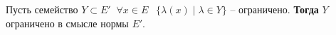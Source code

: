 
\begin{to_thr}
Пусть семейство $Y \subset E'$ $ \ \forall x \in E$ $ \ \ \{\lambda(x) \mid  \lambda \in Y\}$ -- ограничено. \textbf{Тогда } $Y$ ограничено в смысле нормы $E'$.    
\end{to_thr}
